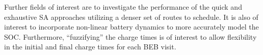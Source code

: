 \documentclass[11pt,a4paper,final]{article}
\begin{document}
Further fields of interest are to investigate the performance of the quick and exhaustive SA approaches utilizing a denser
set of routes to schedule. It is also of interest to incorporate non-linear battery dynamics to more accurately model
the SOC. Furthermore, ``fuzzifying'' the charge times is of interest to allow flexibility in the initial and final charge
times for each BEB visit.



\end{document}
